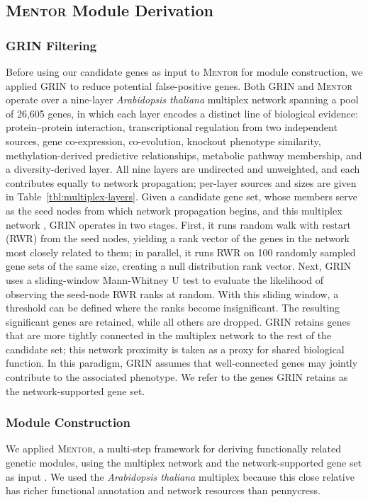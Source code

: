 \subsection{\textsc{Mentor} Module Derivation}\label{sec:ch2-mentor}
\subsubsection{GRIN Filtering}\label{sec:ch2-grin}
Before using our candidate genes as input to \textsc{Mentor} for module construction, we applied GRIN \cite{sullivan2024grin} to reduce potential false-positive genes. Both GRIN and \textsc{Mentor} operate over a nine-layer \textit{Arabidopsis thaliana} multiplex network spanning a pool of 26,605 genes, in which each layer encodes a distinct line of biological evidence: protein--protein interaction, transcriptional regulation from two independent sources, gene co-expression, co-evolution, knockout phenotype similarity, methylation-derived predictive relationships, metabolic pathway membership, and a diversity-derived layer. All nine layers are undirected and unweighted, and each contributes equally to network propagation; per-layer sources and sizes are given in Table~\ref{tbl:multiplex-layers}. Given a candidate gene set, whose members serve as the seed nodes from which network propagation begins, and this multiplex network \cite{kainer2025rwrtoolkit}, GRIN operates in two stages. First, it runs random walk with restart (RWR) from the seed nodes, yielding a rank vector of the genes in the network most closely related to them; in parallel, it runs RWR on 100 randomly sampled gene sets of the same size, creating a null distribution rank vector. Next, GRIN uses a sliding-window Mann-Whitney U test to evaluate the likelihood of observing the seed-node RWR ranks at random. With this sliding window, a threshold can be defined where the ranks become insignificant. The resulting significant genes are retained, while all others are dropped. GRIN retains genes that are more tightly connected in the multiplex network to the rest of the candidate set; this network proximity is taken as a proxy for shared biological function. In this paradigm, GRIN assumes that well-connected genes may jointly contribute to the associated phenotype. We refer to the genes GRIN retains as the network-supported gene set.

\subsubsection{Module Construction}
We applied \textsc{Mentor}, a multi-step framework for deriving functionally related genetic modules, using the multiplex network and the network-supported gene set as input \cite{mentor}. We used the \textit{Arabidopsis thaliana} multiplex because this close relative has richer functional annotation and network resources than pennycress.

